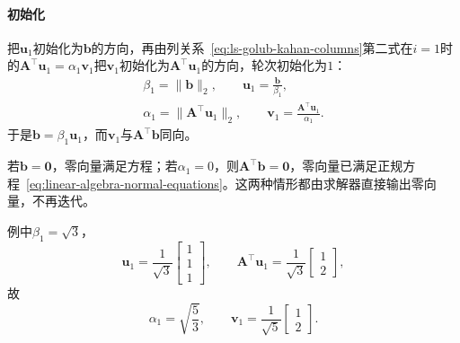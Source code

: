\paragraph{初始化}
把$\bm u_1$初始化为$\bm b$的方向，再由列关系~\eqref{eq:ls-golub-kahan-columns}第二式在$i=1$时的$\bm A^\top\bm u_1=\alpha_1\bm v_1$把$\bm v_1$初始化为$\bm A^\top\bm u_1$的方向，轮次初始化为$1$：
\begin{equation}
 \begin{gathered}
 \beta_1=\lVert\bm b\rVert_2,\qquad \bm u_1=\frac{\bm b}{\beta_1},\\
 \alpha_1=\lVert\bm A^\top\bm u_1\rVert_2,\qquad \bm v_1=\frac{\bm A^\top\bm u_1}{\alpha_1}.
 \end{gathered}
 \label{eq:ls-golub-kahan-start}
\end{equation}
于是$\bm b=\beta_1\bm u_1$，而$\bm v_1$与$\bm A^\top\bm b$同向。

若$\bm b=\bm 0$，零向量满足方程；若$\alpha_1=0$，则$\bm A^\top\bm b=\bm 0$，零向量已满足正规方程~\eqref{eq:linear-algebra-normal-equations}。这两种情形都由求解器直接输出零向量，不再迭代。

例中$\beta_1=\sqrt3$，
\[
 \bm u_1=\frac1{\sqrt3}\begin{bmatrix}1\\1\\1\end{bmatrix},\qquad
 \bm A^\top\bm u_1=\frac1{\sqrt3}\begin{bmatrix}1\\2\end{bmatrix},
\]
故
\[
 \alpha_1=\sqrt{\frac53},\qquad \bm v_1=\frac{1}{\sqrt5}\begin{bmatrix}1\\2\end{bmatrix}.
\]

